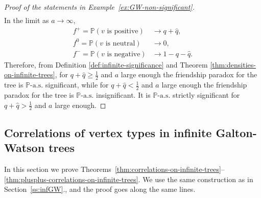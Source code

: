 \documentclass[11pt]{article}
\numberwithin{equation}{section}
\theoremstyle{plain}
\newcommand{\PP}{\mathbb{P}}
\begin{document}
\begin{proof}[Proof of the statements in Example~\ref{ex:GW-non-significant}]
\[\begin{aligned}
\end{aligned}
\]   
In the limit as $a\to\infty$,
\[
\begin{aligned}
f^+ =\PP(v \text{ is positive}) &\to q+\hat{q},\\
f^0 = \PP(v \text{ is neutral}) &\to 0,\\  
f^- = \PP(v \text{ is negative}) &\to 1-q-\hat{q}.
\end{aligned}
\]   
Therefore, from Definition \ref{def:infinite-significance} and Theorem \ref{thm:densities-on-infinite-trees}, for $q+\hat{q}\geq\tfrac12$ and $a$ large enough the friendship paradox for the tree is $\PP\text{-}\mathrm{a.s.}$ significant, while for $q+\hat{q}<\tfrac12$ and $a$ large enough the friendship paradox for the tree is $\PP\text{-}\mathrm{a.s.}$ insignificant. It is $\PP\text{-}\mathrm{a.s.}$  strictly significant for $q+\hat{q}>\tfrac12$ and $a$ large enough.
\end{proof}


\subsection{Correlations of vertex types in infinite Galton-Watson trees}
\label{sec:correlations-proof}

In this section we prove Theorems~\ref{thm:correlations-on-infinite-trees}--\ref{thm:plusplus-correlations-on-infinite-trees}. We use the same construction as in Section~\ref{ss:infGW}., and the proof goes along the same lines. 
\end{document}
